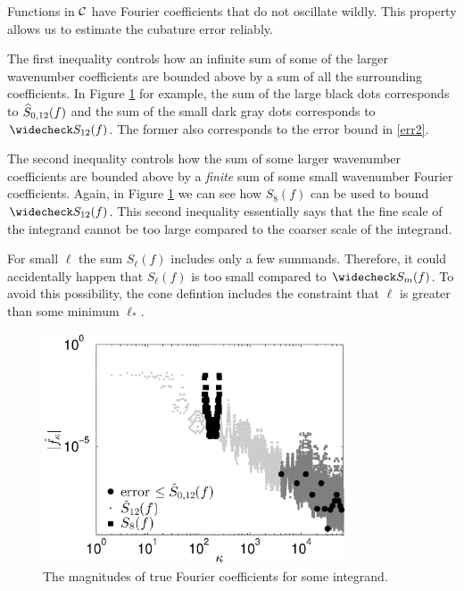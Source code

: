 \documentclass[graybox]{svmult}
\begin{document}
Functions in $\mathcal{C}$ have Fourier coefficients that do not oscillate wildly.  This property allows us to estimate the cubature error reliably. 

The first inequality controls how an infinite sum of some of the larger wavenumber coefficients are bounded above by a sum of all the surrounding coefficients.  In Figure \ref{Walshcoeffig} for example, the sum of the large black dots corresponds to $\widehat{S}_{0,12}(f)$ and the sum of the small dark gray dots corresponds to $\wcS_{12}(f)$. The former also corresponds to the error bound in \eqref{err2}.

The second inequality controls how the sum of some  larger wavenumber coefficients are bounded above by a \emph{finite} sum of some small wavenumber Fourier coefficients. Again, in Figure \ref{Walshcoeffig} we can see how $S_8(f)$ can be used to bound $\wcS_{12}(f)$. This second inequality essentially says that the fine scale of the integrand cannot be too large compared to the coarser scale of the integrand.

For small $\ell$ the sum $S_\ell(f)$ includes only a few summands. Therefore, it could accidentally happen that $S_\ell(f)$ is too small compared to $\wcS_m(f)$. To avoid this possibility, the cone defintion includes the constraint that $\ell$ is greater than some minimum $\ell_*$.

\begin{figure}
\centering
\includegraphics[width=9cm]{Images/PlotFFTCoefUse256.eps}
\caption{The magnitudes of true Fourier coefficients for some integrand. \label{Walshcoeffig}}
\end{figure}
\end{document}

